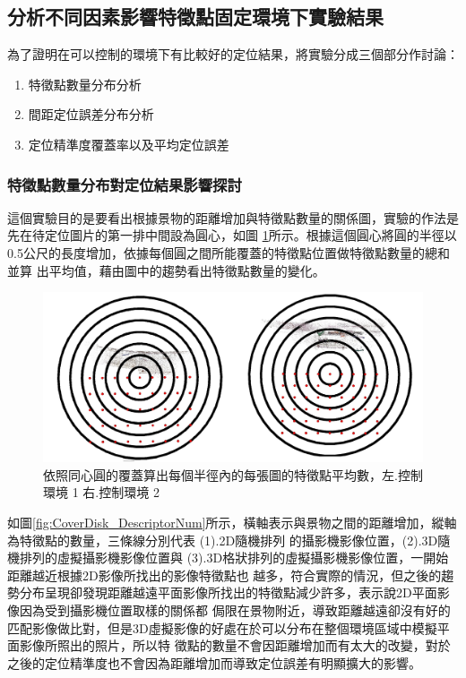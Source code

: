 

\subsection{分析不同因素影響特徵點固定環境下實驗結果}

	為了證明在可以控制的環境下有比較好的定位結果，將實驗分成三個部分作討論：
	
\begin{enumerate}
  \item 特徵點數量分布分析
  \item 間距定位誤差分布分析
  \item 定位精準度覆蓋率以及平均定位誤差
\end{enumerate}

		
\subsubsection{特徵點數量分布對定位結果影響探討}

	這個實驗目的是要看出根據景物的距離增加與特徵點數量的關係圖，實驗的作法是先在待定位圖片的第一排中間設為圓心，如圖
\ref{fig:CoverDisk}所示。根據這個圓心將圓的半徑以 0.5公尺的長度增加，依據每個圓之間所能覆蓋的特徵點位置做特徵點數量的總和並算
出平均值，藉由圖中的趨勢看出特徵點數量的變化。

\begin{figure}
\begin{center}
  \includegraphics[width=1.0\textwidth]{figures/CoverDisk.jpg}
  \caption{依照同心圓的覆蓋算出每個半徑內的每張圖的特徵點平均數，左.控制環境 1 右.控制環境 2}
  \label{fig:CoverDisk}
\end{center}
\end{figure}
	
	如圖\ref{fig:CoverDisk_DescriptorNum}所示，橫軸表示與景物之間的距離增加，縱軸為特徵點的數量，三條線分別代表 (1).2D隨機排列
的攝影機影像位置，(2).3D隨機排列的虛擬攝影機影像位置與 (3).3D格狀排列的虛擬攝影機影像位置，一開始距離越近根據2D影像所找出的影像特徵點也
越多，符合實際的情況，但之後的趨勢分布呈現卻發現距離越遠平面影像所找出的特徵點減少許多，表示說2D平面影像因為受到攝影機位置取樣的關係都
侷限在景物附近，導致距離越遠卻沒有好的匹配影像做比對，但是3D虛擬影像的好處在於可以分布在整個環境區域中模擬平面影像所照出的照片，所以特
徵點的數量不會因距離增加而有太大的改變，對於之後的定位精準度也不會因為距離增加而導致定位誤差有明顯擴大的影響。
			
